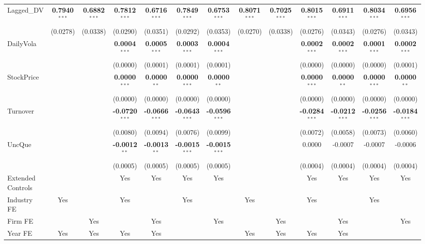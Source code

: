 \begin{landscape}
\begin{table}[H]
\begin{tabular}{lcccccccccccc}
Lagged\_DV & \textbf{0.7940}$^{***}$ & \textbf{0.6882}$^{***}$ & \textbf{0.7812}$^{***}$ & \textbf{0.6716}$^{***}$ & \textbf{0.7849}$^{***}$ & \textbf{0.6753}$^{***}$ & \textbf{0.8071}$^{***}$ & \textbf{0.7025}$^{***}$ & \textbf{0.8015}$^{***}$ & \textbf{0.6911}$^{***}$ & \textbf{0.8034}$^{***}$ & \textbf{0.6956}$^{***}$ \\
 & (0.0278) & (0.0338) & (0.0290) & (0.0351) & (0.0292) & (0.0353) & (0.0270) & (0.0338) & (0.0276) & (0.0343) & (0.0276) & (0.0343) \\
DailyVola &  &  & \textbf{0.0004}$^{***}$ & \textbf{0.0005}$^{***}$ & \textbf{0.0003}$^{***}$ & \textbf{0.0004}$^{***}$ &  &  & \textbf{0.0002}$^{***}$ & \textbf{0.0002}$^{***}$ & \textbf{0.0001}$^{***}$ & \textbf{0.0002}$^{***}$ \\
 &  &  & (0.0000) & (0.0001) & (0.0001) & (0.0001) &  &  & (0.0000) & (0.0000) & (0.0000) & (0.0001) \\
StockPrice &  &  & \textbf{0.0000}$^{***}$ & \textbf{0.0000}$^{**}$ & \textbf{0.0000}$^{***}$ & \textbf{0.0000}$^{**}$ &  &  & \textbf{0.0000}$^{***}$ & \textbf{0.0000}$^{**}$ & \textbf{0.0000}$^{***}$ & \textbf{0.0000}$^{**}$ \\
 &  &  & (0.0000) & (0.0000) & (0.0000) & (0.0000) &  &  & (0.0000) & (0.0000) & (0.0000) & (0.0000) \\
Turnover &  &  & \textbf{-0.0720}$^{***}$ & \textbf{-0.0666}$^{***}$ & \textbf{-0.0643}$^{***}$ & \textbf{-0.0596}$^{***}$ &  &  & \textbf{-0.0284}$^{***}$ & \textbf{-0.0212}$^{***}$ & \textbf{-0.0256}$^{***}$ & \textbf{-0.0184}$^{***}$ \\
 &  &  & (0.0080) & (0.0094) & (0.0076) & (0.0099) &  &  & (0.0072) & (0.0058) & (0.0073) & (0.0060) \\
UncQue &  &  & \textbf{-0.0012}$^{**}$ & \textbf{-0.0013}$^{**}$ & \textbf{-0.0015}$^{***}$ & \textbf{-0.0015}$^{***}$ &  &  & 0.0000 & -0.0007 & -0.0007 & -0.0006 \\
 &  &  & (0.0005) & (0.0005) & (0.0005) & (0.0005) &  &  & (0.0004) & (0.0004) & (0.0004) & (0.0004) \\
\midrule
Extended Controls &  &  & Yes & Yes & Yes & Yes &  &  & Yes & Yes & Yes & Yes \\
Industry FE & Yes &  & Yes &  & Yes &  & Yes &  & Yes &  & Yes &  \\
Firm FE &  & Yes &  & Yes &  & Yes &  & Yes &  & Yes &  & Yes \\
Year FE & Yes & Yes & Yes & Yes &  &  & Yes & Yes & Yes & Yes &  &  \\

\end{tabular}
\end{table}
\end{landscape}
